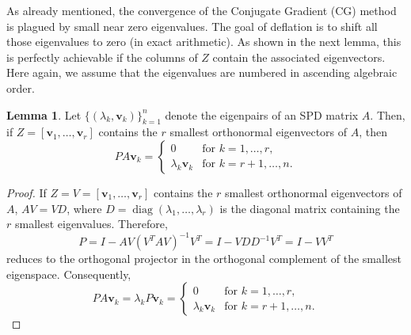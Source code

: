 \documentclass{article}
\numberwithin{equation}{section}
\DeclareMathOperator{\diag}{\operatorname{diag}}
\theoremstyle{definition}
\newtheorem{lemma}[definition]{Lemma}
\begin{document}
As already mentioned, the convergence of the Conjugate Gradient (CG) method is plagued by small near zero eigenvalues. The goal of deflation is to shift all those eigenvalues to zero (in exact arithmetic). As shown in the next lemma, this is perfectly achievable if the columns of $Z$ contain the associated eigenvectors. Here again, we assume that the eigenvalues are numbered in ascending algebraic order.

\begin{lemma}
\label{lem: eigenvectors}
Let $\{(\lambda_k,\bm{v}_k)\}_{k=1}^n$ denote the eigenpairs of an SPD matrix $A$. Then, if $Z=[\bm{v}_1,\dots,\bm{v}_r]$ contains the $r$ smallest orthonormal eigenvectors of $A$, then
\begin{equation*}
    PA\bm{v}_k =
    \begin{cases}
        0 & \text{for } k=1,\dots,r, \\
        \lambda_k \bm{v}_k & \text{for } k=r+1,\dots,n.
    \end{cases}
\end{equation*}
\end{lemma}
\begin{proof}


If $Z=V=[\bm{v}_1,\dots,\bm{v}_r]$ contains the $r$ smallest orthonormal eigenvectors of $A$, $AV=VD$, where $D=\diag(\lambda_1, \dots, \lambda_r)$ is the diagonal matrix containing the $r$ smallest eigenvalues. Therefore,
\begin{equation*}
    P = I - AV(V^TAV)^{-1}V^T = I - VDD^{-1}V^T = I - VV^T
\end{equation*}
reduces to the orthogonal projector in the orthogonal complement of the smallest eigenspace. Consequently,
\begin{equation*}
    PA\bm{v}_k = \lambda_k P \bm{v}_k =
    \begin{cases}
        0 & \text{for } k=1,\dots,r, \\
        \lambda_k \bm{v}_k & \text{for } k=r+1,\dots,n.
    \end{cases}    
\end{equation*}
\end{proof}
\end{document}
